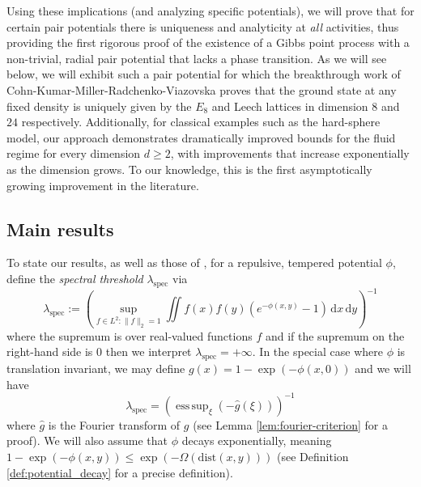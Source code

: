 \documentclass[10pt]{amsart}
\theoremstyle{definition}
\theoremstyle{remark}
\DeclareMathOperator*{\esssup}{ess\,sup}
\newcommand{\spec}{{\mathrm{spec}}}
\newcommand{\dist}{\mathrm{dist}}
\newcommand{\diff}{\mathrm{d}}
\begin{document}
	Using these implications (and analyzing specific potentials), we will prove that for certain pair potentials there is uniqueness and analyticity at \emph{all} activities, thus providing the first rigorous proof of the existence of a Gibbs point process with a non-trivial, radial pair potential  that lacks a phase transition.  As we will see below, we will exhibit such a pair potential for which the breakthrough work of Cohn-Kumar-Miller-Radchenko-Viazovska \cite{cohn2022universal} proves that the ground state at any fixed density is uniquely given by the $E_8$ and Leech lattices in dimension $8$ and $24$ respectively. 
	Additionally, for classical examples such as the hard-sphere model, our approach demonstrates dramatically improved bounds for the fluid regime for every dimension $d \geq 2$, with improvements that increase exponentially as the dimension grows. 
	To our knowledge, this is the first asymptotically growing improvement in the literature.  
	
	
	\subsection{Main results}
	
	To state our results, as well as those of \cite{kondratiev2013spectral}, 
	for a repulsive, tempered potential $\phi$, define the \emph{spectral threshold} $\lambda_{\spec}$ via 
	\begin{equation}\label{eq:lambda-spec-definition}
		\lambda_{\spec} := \left(\sup_{f \in L^2 : \|f \|_2 = 1} \iint f(x) f(y) (e^{-\phi(x,y)} - 1)\,\diff x\,\diff y\right)^{-1}
	\end{equation}
	where the supremum is over real-valued functions $f$ and if the supremum on the right-hand side is $0$ then we interpret $\lambda_{\spec} = +\infty$.  In the special case where $\phi$ is translation invariant, we may define $g(x) = 1 - \exp(-\phi(x,0))$ and we will have \begin{equation}\label{eq:lambda-spec-translation-invariant}
		\lambda_\spec = 
		\left(\esssup_{\xi} (-\widehat{g}(\xi) )\right)^{-1}
	\end{equation}
	where $\widehat{g}$ is the Fourier transform of $g$ (see Lemma \ref{lem:fourier-criterion} for a proof).   We will also assume that $\phi$ decays exponentially, meaning $1 - \exp(-\phi(x,y)) \leq \exp(-\Omega(\dist(x,y)))$ (see Definition \ref{def:potential_decay} for a precise definition).
	
	
	
	
	
\end{document}
